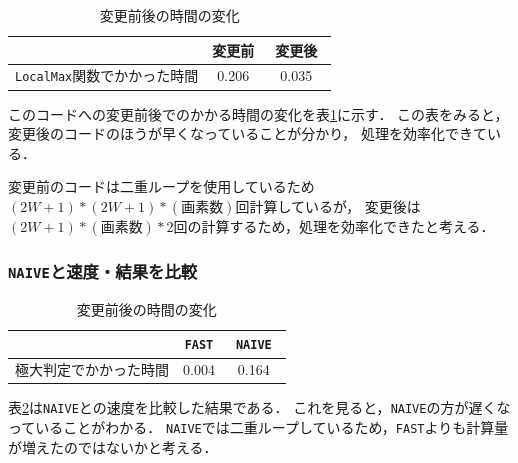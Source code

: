 \documentclass[autodetect-engine,dvi=dvipdfmx,ja=standard,
               a4j,11pt]{bxjsarticle}
\begin{document}
\begin{table}[htbp]
\centering
\caption{変更前後の時間の変化}\label{table:5-2-1}
\begin{tabular}{|c||c|c|}
\hline
 & 変更前 & 変更後　\\
\hline
\texttt{LocalMax}関数でかかった時間 & 0.206 & 0.035 \\
\hline
\end{tabular}\end{table}

このコードへの変更前後でのかかる時間の変化を表\ref{table:5-2-1}に示す．
この表をみると，変更後のコードのほうが早くなっていることが分かり，
処理を効率化できている．

変更前のコードは二重ループを使用しているため$(2W+1)*(2W+1)*(画素数)$回計算しているが，
変更後は$(2W+1)*(画素数)*2$回の計算するため，処理を効率化できたと考える．


\subsubsection{\texttt{NAIVE}と速度・結果を比較}

\begin{table}[htbp]
\centering
\caption{変更前後の時間の変化}\label{table:5-2-2}
\begin{tabular}{|c||c|c|}
\hline
 & \texttt{FAST} & \texttt{NAIVE}　\\
\hline
極大判定でかかった時間 & 0.004 & 0.164 \\
\hline
\end{tabular}\end{table}

表\ref{table:5-2-2}は\verb|NAIVE|との速度を比較した結果である．
これを見ると，\verb|NAIVE|の方が遅くなっていることがわかる．
\verb|NAIVE|では二重ループしているため，\verb|FAST|よりも計算量が増えたのではないかと考える．







\end{document}
